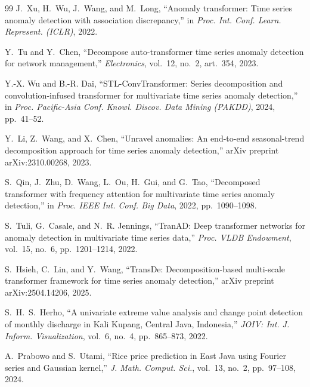 \documentclass[10pt]{article}
\begin{document}
\begin{thebibliography}{99}
J.~Xu, H.~Wu, J.~Wang, and M.~Long, ``Anomaly transformer: Time series anomaly detection with association discrepancy,'' in \textit{Proc. Int. Conf. Learn. Represent. (ICLR)}, 2022.

Y.~Tu and Y.~Chen, ``Decompose auto-transformer time series anomaly detection for network management,'' \textit{Electronics}, vol.~12, no.~2, art.~354, 2023.

Y.-X. Wu and B.-R. Dai, ``STL-ConvTransformer: Series decomposition and convolution-infused transformer for multivariate time series anomaly detection,'' in \textit{Proc. Pacific-Asia Conf. Knowl. Discov. Data Mining (PAKDD)}, 2024, pp.~41--52.

Y.~Li, Z.~Wang, and X.~Chen, ``Unravel anomalies: An end-to-end seasonal-trend decomposition approach for time series anomaly detection,'' arXiv preprint arXiv:2310.00268, 2023.

S.~Qin, J.~Zhu, D.~Wang, L.~Ou, H.~Gui, and G.~Tao, ``Decomposed transformer with frequency attention for multivariate time series anomaly detection,'' in \textit{Proc. IEEE Int. Conf. Big Data}, 2022, pp.~1090--1098.

S.~Tuli, G.~Casale, and N.~R. Jennings, ``TranAD: Deep transformer networks for anomaly detection in multivariate time series data,'' \textit{Proc. VLDB Endowment}, vol.~15, no.~6, pp.~1201--1214, 2022.

S.~Hsieh, C.~Lin, and Y.~Wang, ``TransDe: Decomposition-based multi-scale transformer framework for time series anomaly detection,'' arXiv preprint arXiv:2504.14206, 2025.

S.~H.~S.~Herho, ``A univariate extreme value analysis and change point detection of monthly discharge in Kali Kupang, Central Java, Indonesia,'' \textit{JOIV: Int. J. Inform. Visualization}, vol.~6, no.~4, pp.~865--873, 2022.

A.~Prabowo and S.~Utami, ``Rice price prediction in East Java using Fourier series and Gaussian kernel,'' \textit{J. Math. Comput. Sci.}, vol.~13, no.~2, pp.~97--108, 2024.

\end{thebibliography}
\end{document}
